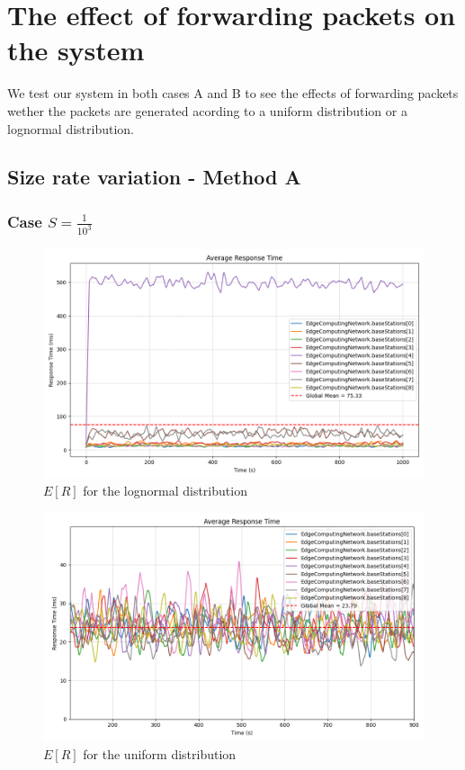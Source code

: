 \documentclass{report}
\begin{document}
\section{The effect of forwarding packets on the system}
We test our system in both cases A and B to see the effects of forwarding packets wether the packets are generated acording to a uniform distribution or a lognormal distribution.

\subsection{Size rate variation - Method A}
\subsubsection*{Case $S=\frac{1}{10^3}$}

\begin{figure}[H]
    \centering
    \includegraphics[width=\textwidth]{img/plots/log_1e3_A/resptime.png}
    \caption{$E[R]$ for the lognormal distribution}
\end{figure}

\begin{figure}[H]
    \centering
    \includegraphics[width=\textwidth]{img/plots/uni_1e3_A/resptime.png}
    \caption{$E[R]$ for the uniform distribution}
\end{figure}
\end{document}
